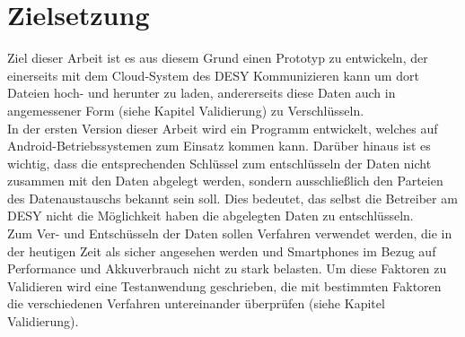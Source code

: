 \documentclass[10pt, a4paper]{scrreprt}
\begin{document}
\section{Zielsetzung}
Ziel dieser Arbeit ist es aus diesem Grund einen Prototyp zu entwickeln, der einerseits mit dem Cloud-System des DESY Kommunizieren kann um dort Dateien hoch- und herunter zu laden, andererseits diese Daten auch in angemessener Form (siehe Kapitel Validierung) zu Verschlüsseln. \\
In der ersten Version dieser Arbeit wird ein Programm entwickelt, welches auf Android-Betriebssystemen zum Einsatz kommen kann. Darüber hinaus ist es wichtig, dass die entsprechenden Schlüssel zum entschlüsseln der Daten nicht zusammen mit den Daten abgelegt werden, sondern ausschließlich den Parteien des Datenaustauschs bekannt sein soll. Dies bedeutet, das selbst die Betreiber am DESY nicht die Möglichkeit haben die abgelegten Daten zu entschlüsseln. \\
Zum Ver- und Entschüsseln der Daten sollen Verfahren verwendet werden, die in der heutigen Zeit als sicher angesehen werden und Smartphones im Bezug auf Performance und Akkuverbrauch nicht zu stark belasten. Um diese Faktoren zu Validieren wird eine Testanwendung geschrieben, die mit bestimmten Faktoren die verschiedenen Verfahren untereinander überprüfen (siehe Kapitel Validierung).



\end{document}
